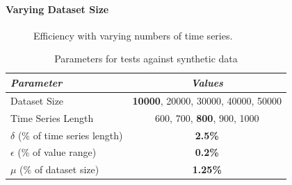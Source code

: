 \paragraph{Varying Dataset Size}
\begin{figure}[!ht]
 \centering
 \caption{Efficiency with varying numbers of time series.}
 \label{fig:exp4}
\end{figure}

\begin{table}[!ht]
\centering
\caption{Parameters for tests against synthetic data}
\begin{small}
\begin{tabular}{lc} 
\hline
{\em Parameter} &{\em Values} \\
\hline
Dataset Size & \textbf{10000}, 20000, 30000, 40000, 50000 \\
Time Series Length & 600, 700, \textbf{800}, 900, 1000 \\
$\delta$ (\% of time series length) & \textbf{2.5\%} \\
$\epsilon$ (\% of value range) & \textbf{0.2\%} \\
$\mu$ (\% of dataset size) & \textbf{1.25\%} \\
\hline
\end{tabular}
\end{small}
\label{tab:parameters2}
\end{table}

